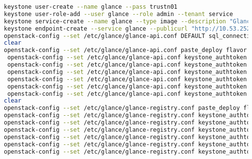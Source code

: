 \documentclass[11pt,letterpaper,oneside]{book}
\begin{document}
\begin{lstlisting}[caption={foo},language=bash]
keystone user-create --name glance --pass trustn01
keystone user-role-add --user glance --role admin --tenant service
keystone service-create --name glance --type image --description "Glance Image Service"
keystone endpoint-create --service glance --publicurl "http://10.53.252.61:9292" --adminurl "http://10.53.252.61:9292" --internalurl "http://10.53.252.61:9292"
openstack-config --set /etc/glance/glance-api.conf DEFAULT sql_connection mysql://glance:trustn01@10.53.252.61/glance
clear
openstack-config --set /etc/glance/glance-api.conf paste_deploy flavor keystone
 openstack-config --set /etc/glance/glance-api.conf keystone_authtoken auth_host 10.53.252.61
 openstack-config --set /etc/glance/glance-api.conf keystone_authtoken auth_port 35357
 openstack-config --set /etc/glance/glance-api.conf keystone_authtoken auth_protocol http
 openstack-config --set /etc/glance/glance-api.conf keystone_authtoken admin_tenant_name service
 openstack-config --set /etc/glance/glance-api.conf keystone_authtoken admin_user glance
 openstack-config --set /etc/glance/glance-api.conf keystone_authtoken admin_password trustn01
clear
openstack-config --set /etc/glance/glance-registry.conf paste_deploy flavor keystone
openstack-config --set /etc/glance/glance-registry.conf keystone_authtoken auth_host 10.53.252.61
openstack-config --set /etc/glance/glance-registry.conf keystone_authtoken auth_port 35357
openstack-config --set /etc/glance/glance-registry.conf keystone_authtoken auth_protocol http
openstack-config --set /etc/glance/glance-registry.conf keystone_authtoken admin_tenant_name service
openstack-config --set /etc/glance/glance-registry.conf keystone_authtoken admin_user glance
openstack-config --set /etc/glance/glance-registry.conf keystone_authtoken admin_password trustn01
\end{lstlisting}
\end{document}
